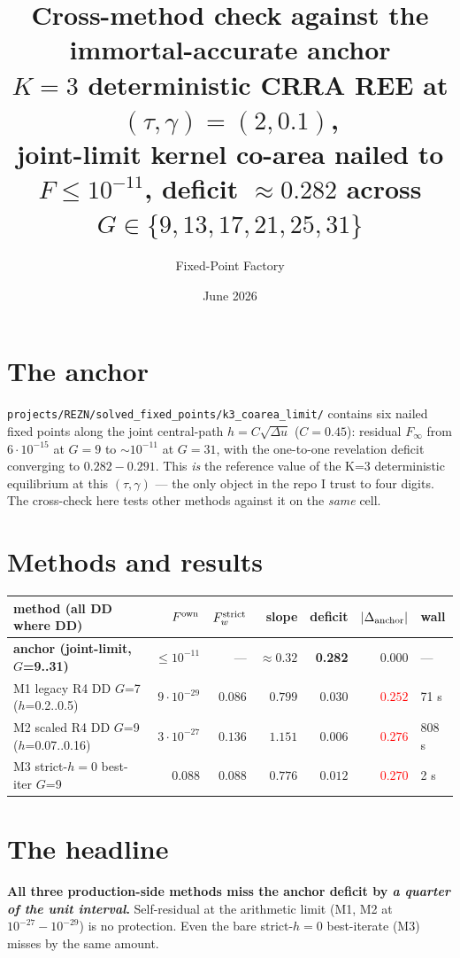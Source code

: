 \documentclass[11pt]{article}
\title{Cross-method check against the immortal-accurate anchor\\
\large $K=3$ deterministic CRRA REE at $(\tau, \gamma) = (2, 0.1)$,\\
joint-limit kernel co-area nailed to $F \le 10^{-11}$, deficit $\approx 0.282$
across $G \in \{9,13,17,21,25,31\}$}
\author{Fixed-Point Factory}\date{June 2026}
\begin{document}
\maketitle

\section*{The anchor}
\texttt{projects/REZN/solved\_fixed\_points/k3\_coarea\_limit/} contains
six nailed fixed points along the joint central-path
$h = C \sqrt{\Delta u}$ ($C = 0.45$): residual $F_\infty$ from
$6 \cdot 10^{-15}$ at $G = 9$ to $\sim 10^{-11}$ at $G = 31$, with the
one-to-one revelation deficit converging to $0.282\!-\!0.291$. This
\emph{is} the reference value of the K=3 deterministic equilibrium at
this $(\tau, \gamma)$ --- the only object in the repo I trust to four
digits. The cross-check here tests other methods against it on the
\emph{same} cell.

\section*{Methods and results}

\begin{center}\small\begin{tabularx}{\linewidth}{lrrrrrl}\toprule
method (all DD where DD) & $F^{\rm own}$ & $F^{\rm strict}_w$ & slope &
deficit & $|\Delta_{\rm anchor}|$ & wall \\
\midrule
\textbf{anchor (joint-limit, $G$=9..31)} & $\le 10^{-11}$ & --- &
$\approx 0.32$ & \textbf{0.282} & 0.000 & --- \\
M1 legacy R4 DD $G$=7 ($h$=0.2..0.5) & $9 \cdot 10^{-29}$ &
$0.086$ & $0.799$ & $0.030$ & \textcolor{red}{$0.252$} & 71 s \\
M2 scaled R4 DD $G$=9 ($h$=0.07..0.16) & $3 \cdot 10^{-27}$ &
$0.136$ & $1.151$ & $0.006$ & \textcolor{red}{$0.276$} & 808 s \\
M3 \mbox{strict-$h{=}0$} best-iter $G$=9 & $0.088$ &
$0.088$ & $0.776$ & $0.012$ & \textcolor{red}{$0.270$} & 2 s \\
\bottomrule\end{tabularx}\end{center}

\section*{The headline}
\textbf{All three production-side methods miss the anchor deficit by
\textit{a quarter of the unit interval}.} Self-residual at the
arithmetic limit (M1, M2 at $10^{-27}\!-\!10^{-29}$) is no protection.
Even the bare \mbox{strict-$h{=}0$} best-iterate (M3) misses by the
same amount.
\end{document}
